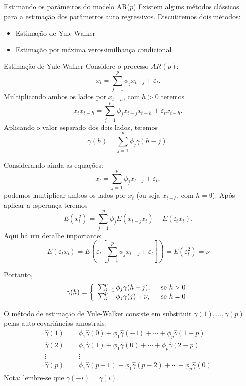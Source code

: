 \documentclass[
  letterpaper,
  DIV=11,
  numbers=noendperiod]{scrreprt}
\theoremstyle{definition}
\theoremstyle{plain}
\theoremstyle{definition}
\theoremstyle{plain}
\theoremstyle{remark}
\begin{document}
\begin{frame}{Estimando os parâmetros do modelo AR($p$)}
    Existem alguns métodos clássicos para a estimação dos parâmetros auto regressivos. Discutiremos dois métodos:
    \begin{itemize}
        \item Estimação de Yule-Walker
        \item Estimação por máxima verossimilhança condicional
    \end{itemize}
\end{frame}

\begin{frame}{Estimação de Yule-Walker}
    Considere o processo $AR(p)$:
    $$x_t = \sum_{j=1}^p \phi_j x_{t-j}+\varepsilon_t.$$
    Multiplicando ambos os lados por $x_{t-h}$, com $h>0$ teremos
    $$x_tx_{t-h} = \sum_{j=1}^p \phi_j x_{t-j}x_{t-h}+\varepsilon_tx_{t-h}.$$
    Aplicando o valor esperado dos dois lados, teremos
    $$\gamma(h) = \sum_{j=1}^p \phi_j \gamma( h-j).$$
\end{frame}

\begin{frame}
Considerando ainda as equações:
$$x_t = \sum_{j=1}^p \phi_j x_{t-j}+\varepsilon_t,$$
podemos multiplicar ambos os lados por $x_t$ (ou seja $x_{t-h}$, com $h=0$). Após aplicar a esperança
teremos
    $$E(x_t^2) = \sum_{j=1}^p \phi_j E(x_{t-j}x_{t})+E(\varepsilon_tx_{t}).$$
Aqui há um detalhe importante:  
$$E(\varepsilon_tx_{t})=E\left(\varepsilon_t\left[\sum_{j=1}^p \phi_j x_{t-j}+\varepsilon_t\right]\right)=E(\varepsilon_t^2)=\nu$$
\end{frame}

\begin{frame}
    Portanto,
    \begin{align}\label{eq:autocovarianca-AR}   
    \gamma(h)=\left\{\begin{array}{ll}
    \sum_{j=1}^p \phi_j \gamma( h-j),&\;\;\hbox{se }h>0\\
    \sum_{j=1}^p \phi_j \gamma( j)+\nu,&\;\;\hbox{se }h=0 \\
    \end{array}\right.
    \end{align}
\end{frame}

\begin{frame}
O método de estimação de Yule-Walker consiste em substituir $\gamma(1),\ldots,\gamma(p)$ pelas auto covariâncias amostrais:
\begin{align*}
\hat{\gamma}(1) &= \phi_1\hat{\gamma}(0) + \phi_1\hat{\gamma}(-1) + \cdots + \phi_p\hat{\gamma}(1-p) \\ 
\hat{\gamma}(2) &= \phi_1\hat{\gamma}(1) + \phi_1\hat{\gamma}(0)  + \cdots + \phi_p\hat{\gamma}(2-p) \\ 
\vdots &= \vdots \\
\hat{\gamma}(p) &= \phi_1\hat{\gamma}(p-1) + \phi_1\hat{\gamma}(p-2)  + \cdots + \phi_p\hat{\gamma}(0)
\end{align*} 
Nota: lembre-se que $\gamma(-i)=\gamma(i)$. 
\end{frame}
\end{document}
